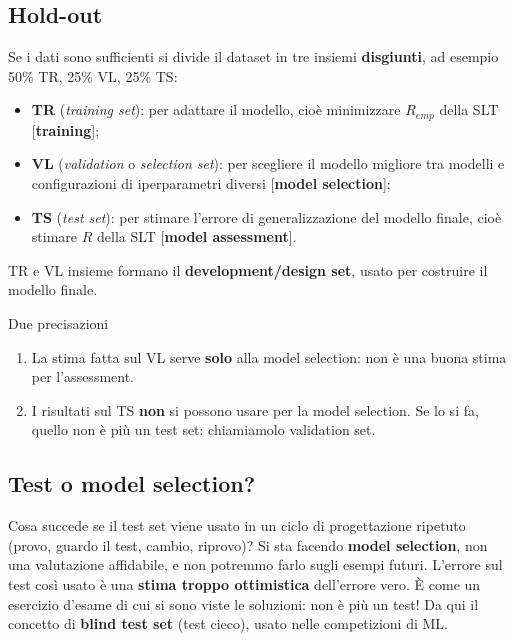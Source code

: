\subsection{Hold-out}\label{hold-out}

Se i dati sono sufficienti si divide il dataset in tre insiemi
\textbf{disgiunti}, ad esempio 50\% TR, 25\% VL, 25\% TS:

\begin{itemize}
\tightlist
\item
  \textbf{TR} (\emph{training set}): per adattare il modello, cioè
  minimizzare \(R_{emp}\) della SLT {[}\textbf{training}{]};
\item
  \textbf{VL} (\emph{validation} o \emph{selection set}): per scegliere
  il modello migliore tra modelli e configurazioni di iperparametri
  diversi {[}\textbf{model selection}{]};
\item
  \textbf{TS} (\emph{test set}): per stimare l'errore di
  generalizzazione del modello finale, cioè stimare \(R\) della SLT
  {[}\textbf{model assessment}{]}.
\end{itemize}

TR e VL insieme formano il \textbf{development/design set}, usato per
costruire il modello finale.

\begin{boxnote}{Due precisazioni}

\begin{enumerate}
\def\labelenumi{\arabic{enumi}.}
\tightlist
\item
  La stima fatta sul VL serve \textbf{solo} alla model selection: non è
  una buona stima per l'assessment.
\item
  I risultati sul TS \textbf{non} si possono usare per la model
  selection. Se lo si fa, quello non è più un test set: chiamiamolo
  validation set.
\end{enumerate}

\end{boxnote}

\subsection{Test o model selection?}\label{test-o-model-selection}

Cosa succede se il test set viene usato in un ciclo di progettazione
ripetuto (provo, guardo il test, cambio, riprovo)? Si sta facendo
\textbf{model selection}, non una valutazione affidabile, e non potremmo
farlo sugli esempi futuri. L'errore sul test così usato è una
\textbf{stima troppo ottimistica} dell'errore vero. È come un esercizio
d'esame di cui si sono viste le soluzioni: non è più un test! Da qui il
concetto di \textbf{blind test set} (test cieco), usato nelle
competizioni di ML.

